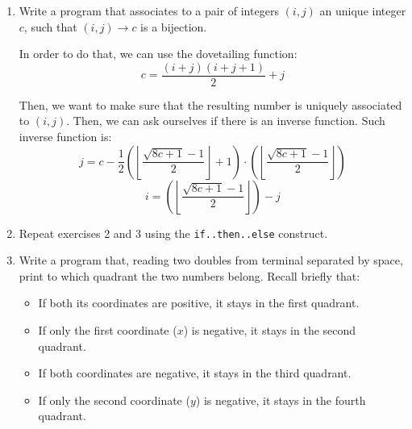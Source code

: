 \documentclass[]{scrartcl}
\begin{document}
\begin{enumerate}
\item  Write a program that associates to a pair of integers $(i,j)$ an unique integer 
$c$, such that $(i,j)\to c$ is a bijection.

In order to do that, we can use the dovetailing function:
\[c = \frac{(i+j)(i+j+1)}{2} + j\]

Then, we want to make sure that the resulting number is uniquely associated to $(i,j)$. Then, we can ask ourselves if there is an inverse function. Such inverse function is:
\[j = c - \frac{1}{2}\left(\left\lfloor\frac{\sqrt{8c+1}-1}{2}\right\rfloor + 1\right) \cdot\left(\left\lfloor\frac{\sqrt{8c+1}-1}{2}\right\rfloor\right)\]
\[i = \left(\left\lfloor\frac{\sqrt{8c+1}-1}{2}\right\rfloor\right)-j\]

\color{red}
\item Repeat exercises 2 and 3 using the \texttt{if..then..else} construct.
\item Write a program that, reading two doubles from terminal separated by space, print to which quadrant the two numbers belong.
Recall briefly that: 
\begin{itemize} 
	\item If both its coordinates are positive, it stays in the first quadrant.
	\item If only the first coordinate ($x$) is negative, it stays in the second quadrant.
	\item If both coordinates are negative, it stays in the third quadrant.
	\item If only the second coordinate ($y$) is negative, it stays in the fourth quadrant.
\end{itemize}


\end{enumerate}
\end{document}
